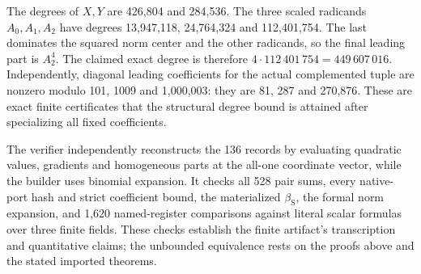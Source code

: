 The degrees of $X,Y$ are 426,804 and 284,536. The three scaled radicands
$A_0,A_1,A_2$ have degrees 13,947,118, 24,764,324 and 112,401,754.
The last dominates the squared norm center and the other radicands, so
the final leading part is $A_2^4$. The claimed exact degree is therefore
$4\cdot112\,401\,754=449\,607\,016$.
Independently, diagonal leading coefficients for the actual complemented
tuple are nonzero modulo 101, 1009 and 1,000,003: they are 81, 287 and 270,876.
These are exact finite certificates that the structural degree bound is
attained after specializing all fixed coefficients.

The verifier independently reconstructs the 136 records by evaluating
quadratic values, gradients and homogeneous parts at the all-one
coordinate vector, while the builder uses binomial expansion. It checks
all 528 pair sums, every native-port hash and strict coefficient bound,
the materialized $\beta_{\mathrm S}$, the formal norm expansion, and
1,620 named-register comparisons against literal scalar formulas over
three finite fields. These checks establish the finite artifact's
transcription and quantitative claims; the unbounded equivalence rests
on the proofs above and the stated imported theorems.
